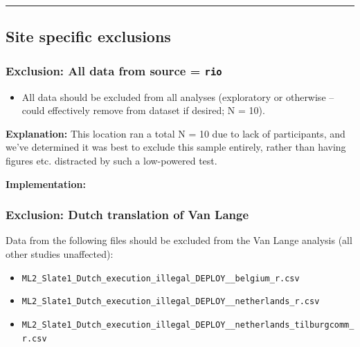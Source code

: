 \documentclass[]{article}
\newenvironment{Shaded}{\begin{snugshade}}{\end{snugshade}}
\newcommand{\KeywordTok}[1]{\textcolor[rgb]{0.94,0.87,0.69}{{#1}}}
\newcommand{\StringTok}[1]{\textcolor[rgb]{0.80,0.58,0.58}{{#1}}}
\newcommand{\NormalTok}[1]{\textcolor[rgb]{0.80,0.80,0.80}{{#1}}}
\begin{document}
\begin{center}\rule{0.5\linewidth}{\linethickness}\end{center}

\subsection{Site specific exclusions}\label{site-specific-exclusions}

\subsubsection{\textbf{Exclusion:} All data from source =
\texttt{rio}}\label{exclusion-all-data-from-source-rio}

\begin{itemize}
\itemsep1pt\parskip0pt
\item
  All data should be excluded from all analyses (exploratory or
  otherwise -- could effectively remove from dataset if desired; N =
  10).
\end{itemize}

\textbf{Explanation:} This location ran a total N = 10 due to lack of
participants, and we've determined it was best to exclude this sample
entirely, rather than having figures etc. distracted by such a
low-powered test.

\textbf{Implementation:}

\begin{Shaded}
\end{Shaded}

\subsubsection{\textbf{Exclusion:} Dutch translation of Van
Lange}\label{exclusion-dutch-translation-of-van-lange}

Data from the following files should be excluded from the Van Lange
analysis (all other studies unaffected):

\begin{itemize}
\itemsep1pt\parskip0pt
\item
  \texttt{ML2\_Slate1\_Dutch\_execution\_illegal\_DEPLOY\_\_belgium\_r.csv}
\item
  \texttt{ML2\_Slate1\_Dutch\_execution\_illegal\_DEPLOY\_\_netherlands\_r.csv}
\item
  \texttt{ML2\_Slate1\_Dutch\_execution\_illegal\_DEPLOY\_\_netherlands\_tilburgcomm\_r.csv}
\end{itemize}
\end{document}
